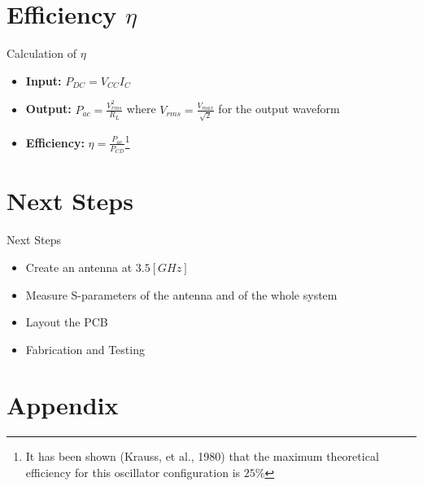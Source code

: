 \documentclass{beamer}
\begin{document}

\section{Efficiency \(\eta\)}

\begin{frame}{Calculation of \(\eta\)}
\begin{itemize}
  \item <1-> \textbf{Input:} \(P_{DC} = V_{CC}I_C\)
  \item <2-> \textbf{Output:} \(P_{ac} = \frac{V_{rms}^2}{R_L}\) where \(V_{rms}=\frac{V_{max}}{\sqrt{2}}\) for the output waveform
  \item <3-> \textbf{Efficiency:} \(\eta=\frac{P_{ac}}{P_{CD}}\)\footnote{It has been shown (Krauss, et al., 1980) that the maximum theoretical efficiency for this oscillator configuration is \(25\%\)}
\end{itemize}

\end{frame}



\section{Next Steps}

\begin{frame}{Next Steps}
\begin{itemize}
  \item <1-> Create an antenna at \(3.5[GHz]\)
  \item <2-> Measure S-parameters of the antenna and of the whole system
  \item <3-> Layout the PCB
  \item <4-> Fabrication and Testing
\end{itemize}
\end{frame}

\section*{Appendix}
\end{document}
